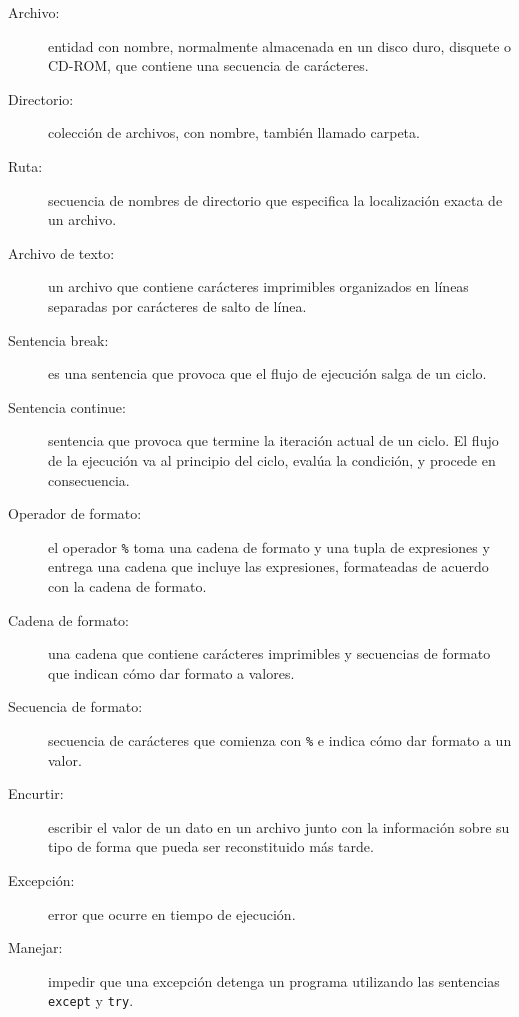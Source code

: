 \begin{description}

\item[Archivo:] entidad con nombre, normalmente almacenada en un disco
duro, disquete o CD-ROM, que contiene una secuencia de carácteres.

\item[Directorio:] colección de archivos, con nombre, también llamado carpeta.

\item[Ruta:] secuencia de nombres de directorio que especifica la localización
exacta de un archivo.

\item[Archivo de texto:] un archivo que contiene carácteres imprimibles organizados
en líneas separadas por carácteres de salto de línea.

\item[Sentencia break:] es una sentencia que provoca que el flujo de ejecución salga de
un ciclo.

\item[Sentencia continue:] sentencia que provoca que termine la
iteración actual de un ciclo. El flujo de la ejecución va al principio
del ciclo, evalúa la condición, y procede en consecuencia.

\item[Operador de formato:] el operador \texttt{\%} toma una cadena de
formato y una tupla de expresiones y entrega una cadena que incluye
las expresiones, formateadas de acuerdo con la cadena de formato.

\item[Cadena de formato:] una cadena que contiene carácteres imprimibles
y secuencias de formato que indican cómo dar formato a valores.

\item[Secuencia de formato:] secuencia de carácteres que comienza con
\texttt{\%} e indica cómo dar formato a un valor.

\item[Encurtir:] escribir el valor de un dato en un archivo junto con la
información sobre su tipo de forma que pueda ser reconstituido más tarde.

\item[Excepción:] error que ocurre en tiempo de ejecución.

\item[Manejar:] impedir que una excepción detenga un programa utilizando
las sentencias \texttt{except} y \texttt{try}.



\end{description}

